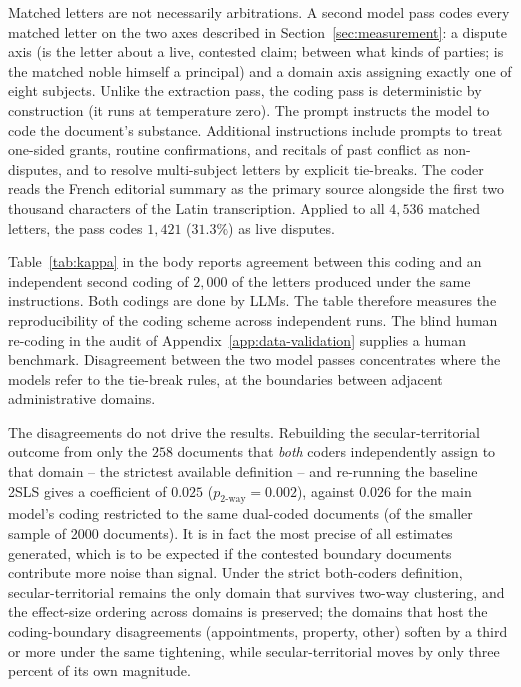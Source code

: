 \documentclass[12pt]{article}
\theoremstyle{definition}
\theoremstyle{remark}
\begin{document}
Matched letters are not necessarily arbitrations. A second model pass codes every matched letter on the two axes described in Section~\ref{sec:measurement}: a dispute axis (is the letter about a live, contested claim; between what kinds of parties; is the matched noble himself a principal) and a domain axis assigning exactly one of eight subjects. Unlike the extraction pass, the coding pass is deterministic by construction (it runs at temperature zero). The prompt instructs the model to code the document's substance. Additional instructions include prompts to treat one-sided grants, routine confirmations, and recitals of past conflict as non-disputes, and to resolve multi-subject letters by explicit tie-breaks. The coder reads the French editorial summary as the primary source alongside the first two thousand characters of the Latin transcription. Applied to all $4{,}536$ matched letters, the pass codes $1{,}421$ ($31.3\%$) as live disputes.

Table~\ref{tab:kappa} in the body reports agreement between this coding and an independent second coding of $2{,}000$ of the letters produced under the same instructions. Both codings are done by LLMs. The table therefore measures the reproducibility of the coding scheme across independent runs. The blind human re-coding in the audit of Appendix~\ref{app:data-validation} supplies a human benchmark. Disagreement between the two model passes concentrates where the models refer to the tie-break rules, at the boundaries between adjacent administrative domains.

The disagreements do not drive the results. Rebuilding the secular-territorial outcome from only the $258$ documents that \emph{both} coders independently assign to that domain -- the strictest available definition -- and re-running the baseline 2SLS gives a coefficient of $0.025$ ($p_{\text{2-way}} = 0.002$), against $0.026$ for the main model's coding restricted to the same dual-coded documents (of the smaller sample of 2000 documents). It is in fact the most precise of all estimates generated, which is to be expected if the contested boundary documents contribute more noise than signal. Under the strict both-coders definition, secular-territorial remains the only domain that survives two-way clustering, and the effect-size ordering across domains is preserved; the domains that host the coding-boundary disagreements (appointments, property, other) soften by a third or more under the same tightening, while secular-territorial moves by only three percent of its own magnitude.
\end{document}
